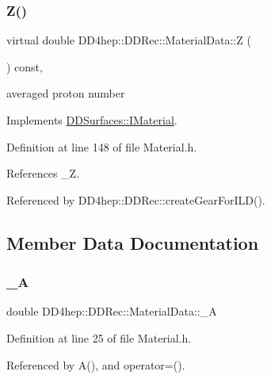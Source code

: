 \subsubsection{\texorpdfstring{Z()}{Z()}}
{\footnotesize\ttfamily virtual double D\+D4hep\+::\+D\+D\+Rec\+::\+Material\+Data\+::Z (\begin{DoxyParamCaption}{ }\end{DoxyParamCaption}) const\hspace{0.3cm}{\ttfamily [inline]}, {\ttfamily [virtual]}}



averaged proton number 



Implements \hyperlink{class_d_d_surfaces_1_1_i_material_a3e5d3e85db97ff9edb25a073109a14b0}{D\+D\+Surfaces\+::\+I\+Material}.



Definition at line 148 of file Material.\+h.



References \+\_\+Z.



Referenced by D\+D4hep\+::\+D\+D\+Rec\+::create\+Gear\+For\+I\+L\+D().



\subsection{Member Data Documentation}
\hypertarget{class_d_d4hep_1_1_d_d_rec_1_1_material_data_a0f26dcc4953ef81b56673d32a3cdd66c}{}\label{class_d_d4hep_1_1_d_d_rec_1_1_material_data_a0f26dcc4953ef81b56673d32a3cdd66c} 
\subsubsection{\texorpdfstring{\+\_\+A}{\_A}}
{\footnotesize\ttfamily double D\+D4hep\+::\+D\+D\+Rec\+::\+Material\+Data\+::\+\_\+A\hspace{0.3cm}{\ttfamily [protected]}}



Definition at line 25 of file Material.\+h.



Referenced by A(), and operator=().

\hypertarget{class_d_d4hep_1_1_d_d_rec_1_1_material_data_a7917025516bbbdaa104c86d6e95ddb28}{}\label{class_d_d4hep_1_1_d_d_rec_1_1_material_data_a7917025516bbbdaa104c86d6e95ddb28} 
